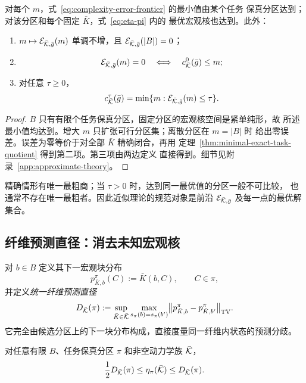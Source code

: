 \begin{theorem}
\label{thm:complexity-error-frontier}
对每个 $m$，式~\eqref{eq:complexity-error-frontier} 的最小值由某个任务
保真分区达到；对该分区和每个固定 $\bar K$，式~\eqref{eq:eta-pi} 内的
最优宏观核也达到。此外：
\begin{enumerate}
  \item $m\mapsto\mathcal E_{\bar{\mathcal K},\bar g}(m)$ 单调不增，且
  $\mathcal E_{\bar{\mathcal K},\bar g}(|B|)=0$；
  \item
  \[
  \mathcal E_{\bar{\mathcal K},\bar g}(m)=0
  \quad\Longleftrightarrow\quad
  c_{\bar{\mathcal K}}^{0}(\bar g)\le m;
  \]
  \item 对任意 $\tau\ge0$，
  \begin{equation}
  c_{\bar{\mathcal K}}^{\tau}(\bar g)
  =\min\{m:\mathcal E_{\bar{\mathcal K},\bar g}(m)\le\tau\}.
  \label{eq:tolerance-frontier-inverse}
  \end{equation}
\end{enumerate}
\end{theorem}

\begin{proof}
$B$ 只有有限个任务保真分区，固定分区的宏观核空间是紧单纯形，故
所述最小值均达到。增大 $m$ 只扩张可行分区集；离散分区在 $m=|B|$ 时
给出零误差。误差为零等价于对全部 $\bar K$ 精确闭合，再用
定理~\ref{thm:minimal-exact-task-quotient} 得到第二项。第三项由两边定义
直接得到。细节见附录~\ref{app:approximate-theory}。
\end{proof}

精确情形有唯一最粗商；当 $\tau>0$ 时，达到同一最优值的分区一般不可比较，
也通常不存在唯一最粗者。因此近似理论的规范对象是前沿
$\mathcal E_{\bar{\mathcal K},\bar g}$ 及每一点的最优解集合。

\subsection{纤维预测直径：消去未知宏观核}

对 $b\in B$ 定义其下一宏观块分布
\[
p^{\pi}_{\bar K,b}(C):=\bar K(b,C),
\qquad C\in\pi,
\]
并定义\emph{统一纤维预测直径}
\begin{equation}
D_{\bar{\mathcal K}}(\pi)
:=
\sup_{\bar K\in\bar{\mathcal K}}
\max_{s_\pi(b)=s_\pi(b')}
\bigl\|p^{\pi}_{\bar K,b}-p^{\pi}_{\bar K,b'}\bigr\|_{\operatorname{TV}}.
\label{eq:fiber-diameter}
\end{equation}
它完全由候选分区上的下一块分布构成，直接度量同一纤维内状态的预测分歧。

\begin{lemma}
\label{lem:radius-diameter}
对任意有限 $B$、任务保真分区 $\pi$ 和非空动力学族 $\bar{\mathcal K}$，
\begin{equation}
\frac12D_{\bar{\mathcal K}}(\pi)
\le
\eta_\pi(\bar{\mathcal K})
\le
D_{\bar{\mathcal K}}(\pi).
\label{eq:radius-diameter}
\end{equation}
\end{lemma}


